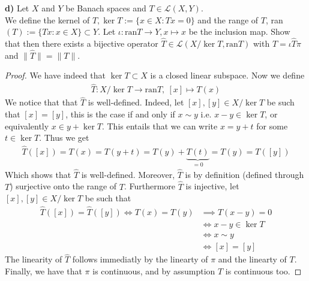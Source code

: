 \documentclass[12pt,a4paper]{article}
\theoremstyle{definition}
\begin{document}
\newpage
\noindent \textbf{d)} Let $X$ and $Y$ be Banach spaces and $T \in \mathcal{L}(X,Y)$. \\ We define the kernel of $T, \ker T := \lbrace x \in X : Tx = 0 \rbrace$ and the range of $T$, ran$(T):= \lbrace Tx: x \in X \rbrace \subset Y$. Let $\iota : \text{ran}T \to Y , x \mapsto x$ be the inclusion map. Show that then there exists a bijective operator $\hat{T} \in \mathcal{L}(X/ \ker T, \text{ran}T)$ with $T = \iota \hat{T} \pi$ and $\| \hat{T} \| = \|T \|$. 
\begin{proof}
We have indeed that $\ker T \subset X$ is a closed linear subspace. Now we define 
\begin{align*}
\hat{T}: X/\ker T \to \text{ran}T, \  [x] \mapsto T(x)
\end{align*}
We notice that that $\hat{T}$ is well-defined. Indeed, let $[x], [y] \in X/ \ker T$ be such that $[x]=[y]$, this is the case if and only if $x \sim y$ i.e. $x-y \in \ker T$, or equivalently $x \in y + \ker T$. This entails that we can write $x= y + t$ for some $t \in \ker T$. Thus we get
\begin{align*}
\hat{T}([x])=T(x)= T(y+t)=T(y)+\underbrace{T(t)}_{=0} = T(y)=T([y])
\end{align*}
Which shows that $\hat{T}$ is well-defined. Moreover, $\hat{T}$ is by definition (defined through $T$) surjective onto the range of $T$. Furthermore $\hat{T}$ is injective, let $[x],[y] \in X/\ker T$ be such that 
\begin{align*}
\hat{T}([x])=\hat{T}([y]) \iff T(x)=T(y)& \implies T(x-y)=0 \\
 &\iff x-y \in \ker T \\
 & \iff x \sim y \\
 & \iff [x]=[y]
\end{align*} 
The linearity of $\hat{T}$ follows immediatly by the linearty of $\pi$ and the linearty of $T$. Finally, we have that $\pi$ is continuous, and by assumption $T$ is continuous too. 


\end{proof}
\end{document}
